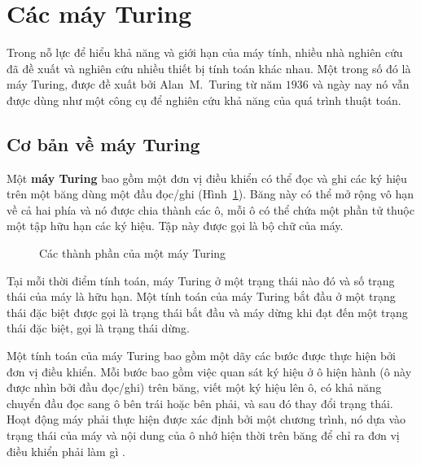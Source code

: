 
\section{Các máy Turing}
\label{sec:112}
Trong nỗ lực để hiểu khả năng và giới hạn của máy tính, nhiều nhà nghiên cứu đã đề xuất và
nghiên cứu nhiều thiết bị tính toán khác nhau. Một trong số đó là máy Turing, được đề xuất
bởi Alan~M.~Turing từ năm $1936$ và ngày nay nó vẫn được dùng như một công cụ để nghiên
cứu khả năng của quá trình thuật toán.

\subsection*{Cơ bản về máy Turing}
Một \textbf{máy Turing} bao gồm một đơn vị điều khiển có thể đọc và ghi các ký hiệu trên
một băng dùng một đầu đọc/ghi (Hình~\ref{fig:fig112}). Băng này có thể mở rộng vô hạn về
cả hai phía và nó được chia thành các ô, mỗi ô có thể chứa một phần tử thuộc một tập hữu
hạn các ký hiệu. Tập này được gọi là bộ chữ của máy.

\begin{figure}[bht]
  \centering 
  \caption{Các thành phần của một máy Turing}
\label{fig:fig112}
\end{figure}

Tại mỗi thời điểm tính toán, máy Turing ở một trạng thái nào đó và số trạng thái của máy
là hữu hạn. Một tính toán của máy Turing bắt đầu ở một trạng thái đặc biệt được gọi là
trạng thái bắt đầu và máy dừng khi đạt đến một trạng thái đặc biệt, gọi là trạng thái
dừng.


Một tính toán của máy Turing bao gồm một dãy các bước được thực hiện bởi đơn vị điều
khiển. Mỗi bước bao gồm việc quan sát ký hiệu ở ô hiện hành (ô này được nhìn bởi đầu
đọc/ghi) trên băng, viết một ký hiệu lên ô, có khả năng chuyển đầu đọc sang ô bên trái
hoặc bên phải, và sau đó thay đổi trạng thái. Hoạt động máy phải thực hiện được xác định
bởi một chương trình, nó dựa vào trạng thái của máy và nội dung của ô nhớ hiện thời trên
băng để chỉ ra đơn vị điều khiển phải làm gì .

